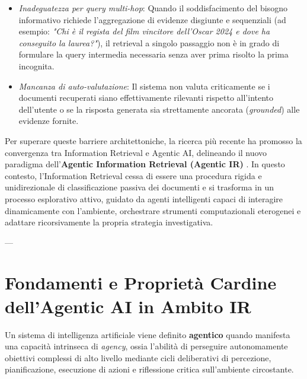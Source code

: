\begin{enumerate}
\begin{itemize}
        \item \textit{Inadeguatezza per query multi-hop}: Quando il soddisfacimento del bisogno informativo richiede l'aggregazione di evidenze disgiunte e sequenziali (ad esempio: \textit{"Chi è il regista del film vincitore dell'Oscar 2024 e dove ha conseguito la laurea?"}), il retrieval a singolo passaggio non è in grado di formulare la query intermedia necessaria senza aver prima risolto la prima incognita.
        \item \textit{Mancanza di auto-valutazione}: Il sistema non valuta criticamente se i documenti recuperati siano effettivamente rilevanti rispetto all'intento dell'utente o se la risposta generata sia strettamente ancorata (\textit{grounded}) alle evidenze fornite.
    \end{itemize}
\end{enumerate}

Per superare queste barriere architettoniche, la ricerca più recente ha promosso la convergenza tra Information Retrieval e Agentic AI, delineando il nuovo paradigma dell'\textbf{Agentic Information Retrieval (Agentic IR)} \cite{zhang2024ai, wu2025agentic}. In questo contesto, l'Information Retrieval cessa di essere una procedura rigida e unidirezionale di classificazione passiva dei documenti e si trasforma in un processo esplorativo attivo, guidato da agenti intelligenti capaci di interagire dinamicamente con l'ambiente, orchestrare strumenti computazionali eterogenei e adattare ricorsivamente la propria strategia investigativa.

---

\section{Fondamenti e Proprietà Cardine dell'Agentic AI in Ambito IR}
\label{sec:fondamenti_agentic}

Un sistema di intelligenza artificiale viene definito \textbf{agentico} quando manifesta una capacità intrinseca di \textit{agency}, ossia l'abilità di perseguire autonomamente obiettivi complessi di alto livello mediante cicli deliberativi di percezione, pianificazione, esecuzione di azioni e riflessione critica sull'ambiente circostante.

